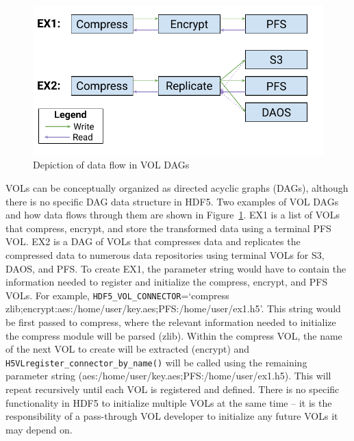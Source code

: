 \begin{figure}[!ht]
  \centering
  \includegraphics{images/tour_4_vol_dags.pdf}
  \caption{Depiction of data flow in VOL DAGs}
  \label{fig:vol-dag}
\end{figure}

VOLs can be conceptually organized as directed acyclic graphs (DAGs), although there is no specific DAG data structure in HDF5. Two examples of VOL DAGs and how data flows through them are shown in Figure~\ref{fig:vol-dag}. EX1 is a list of VOLs that compress, encrypt, and store the transformed data using a terminal PFS VOL. EX2 is a DAG of VOLs that compresses data and replicates the compressed data to numerous data repositories using terminal VOLs for S3, DAOS, and PFS. To create EX1, the parameter string would have to contain the information needed to register and initialize the compress, encrypt, and PFS VOLs. For example, \texttt{HDF5\_VOL\_CONNECTOR}=`compress zlib;encrypt:aes:/home/user/key.aes;PFS:/home/user/ex1.h5'. This string would be first passed to compress, where the relevant information needed to initialize the compress module will be parsed (zlib). Within the compress VOL, the name of the next VOL to create will be extracted (encrypt) and \texttt{H5VLregister\_connector\_by\_name()} will be called using the remaining parameter string (aes:/home/user/key.aes;PFS:/home/user/ex1.h5). This will repeat recursively until each VOL is registered and defined. There is no specific functionality in HDF5 to initialize multiple VOLs at the same time -- it is the responsibility of a pass-through VOL developer to initialize any future VOLs it may depend on.

